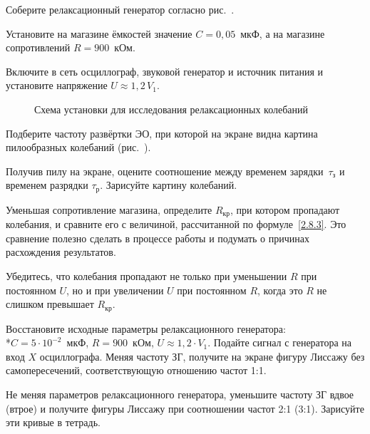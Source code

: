 \begin{lab:task}
		\item Соберите релаксационный генератор согласно
         рис.~.

		\item Установите на магазине ёмкостей значение $C=0,05$~мкФ, а на
магазине сопротивлений $R=900$~кОм.

		\item Включите в сеть осциллограф, звуковой генератор и источник питания
и установите напряжение $U\approx 1,2\,V_1$.

\begin{figure}[h!]
	\caption{Схема установки для исследования релаксационных колебаний}
\end{figure}

		\item Подберите частоту развёртки ЭО, при которой на экране видна
картина пилообразных колебаний (рис.~).

		\item Получив пилу на экране, оцените соотношение между временем
зарядки~$\tau_{\text{з}}$ и временем разрядки $\tau_{\text{р}}$.
Зарисуйте картину колебаний.

		\item Уменьшая сопротивление магазина, определите $R_{\text{кр}}$, при
котором пропадают колебания, и сравните его с величиной,
рассчитанной по формуле~\eqref{2.8.3}. Это сравнение полезно сделать в процессе
работы и подумать о причинах расхождения
результатов.

Убедитесь, что колебания пропадают не только при уменьшении $R$ при постоянном
$U$, но и при увеличении $U$ при
постоянном $R$, когда это $R$ не слишком превышает $R_{\text{кр}}$.


		\item Восстановите исходные параметры релаксационного
генератора:\\*$C=5\cdot 10^{-2}$~мкФ, $R=900$~кОм, $U\approx 1,2 \cdot
V_1$. Подайте сигнал с генератора на вход $X$ осциллографа. Меняя частоту ЗГ,
получите на экране фигуру Лиссажу без
самопересечений, соответствующую отношению частот 1:1.

		\item Не меняя параметров релаксационного генератора, уменьшите частоту
ЗГ вдвое (втрое) и получите фигуры Лиссажу при
соотношении частот 2:1 (3:1). Зарисуйте эти кривые в тетрадь.


\end{lab:task}
